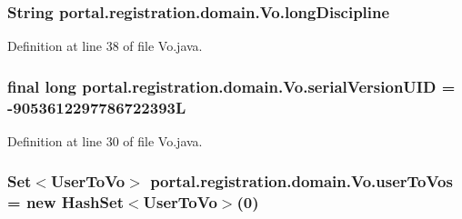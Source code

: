 \hypertarget{classportal_1_1registration_1_1domain_1_1Vo_ace2d40b5322f647c70ba092e468edaec}{
\subsubsection[{longDiscipline}]{\setlength{\rightskip}{0pt plus 5cm}String {\bf portal.registration.domain.Vo.longDiscipline}}}
\label{classportal_1_1registration_1_1domain_1_1Vo_ace2d40b5322f647c70ba092e468edaec}


Definition at line 38 of file Vo.java.

\hypertarget{classportal_1_1registration_1_1domain_1_1Vo_aa9365210570260c23bbc54f07154598c}{
\subsubsection[{serialVersionUID}]{\setlength{\rightskip}{0pt plus 5cm}final long {\bf portal.registration.domain.Vo.serialVersionUID} = -\/9053612297786722393L}}
\label{classportal_1_1registration_1_1domain_1_1Vo_aa9365210570260c23bbc54f07154598c}


Definition at line 30 of file Vo.java.

\hypertarget{classportal_1_1registration_1_1domain_1_1Vo_a643d30daf36de4c59c48ce381f5ca18d}{
\subsubsection[{userToVos}]{\setlength{\rightskip}{0pt plus 5cm}Set$<${\bf UserToVo}$>$ {\bf portal.registration.domain.Vo.userToVos} = new HashSet$<${\bf UserToVo}$>$(0)}}
\label{classportal_1_1registration_1_1domain_1_1Vo_a643d30daf36de4c59c48ce381f5ca18d}


